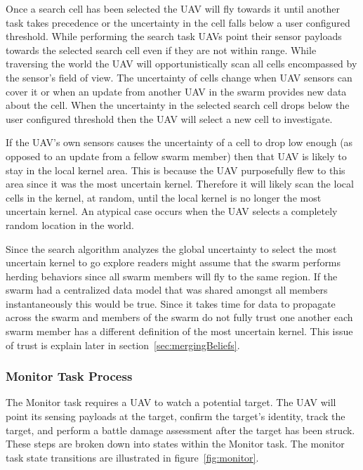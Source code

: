 

Once a search cell has been selected the UAV will fly towards it until another task takes precedence or the uncertainty in the cell falls below a user configured threshold.  While performing the search task UAVs point their sensor payloads towards the selected search cell even if they are not within range.  While traversing the world the UAV will opportunistically scan all cells encompassed by the sensor's field of view.  The uncertainty of cells change when UAV sensors can cover it or when an update from another UAV in the swarm provides new data about the cell. When the uncertainty in the selected search cell drops below the user configured threshold then the UAV will select a new cell to investigate.  

If the UAV's own sensors causes the uncertainty of a cell to drop low enough (as opposed to an update from a fellow swarm member) then that UAV is likely to stay in the local kernel area.  This is because the UAV purposefully flew to this area since it was the most uncertain kernel.  Therefore it will likely scan the local cells in the kernel, at random, until the local kernel is no longer the most uncertain kernel.  An atypical case occurs when the UAV selects a completely random location in the world.

Since the search algorithm analyzes the global uncertainty to select the most uncertain kernel to go explore readers might assume that the swarm performs herding behaviors since all swarm members will fly to the same region.  If the swarm had a centralized data model that was shared amongst all members instantaneously this would be true.  Since it takes time for data to propagate across the swarm and members of the swarm do not fully trust one another each swarm member has a different definition of the most uncertain kernel.  This issue of trust is explain later in section~\ref{sec:mergingBeliefs}.

\subsubsection{Monitor Task Process}
The Monitor task requires a UAV to watch a potential target.  The UAV will point its sensing payloads at the target, confirm the target's identity, track the target, and perform a battle damage assessment after the target has been struck.  These steps are broken down into states within the Monitor task.  The monitor task state transitions are illustrated in figure~\ref{fig:monitor}.

